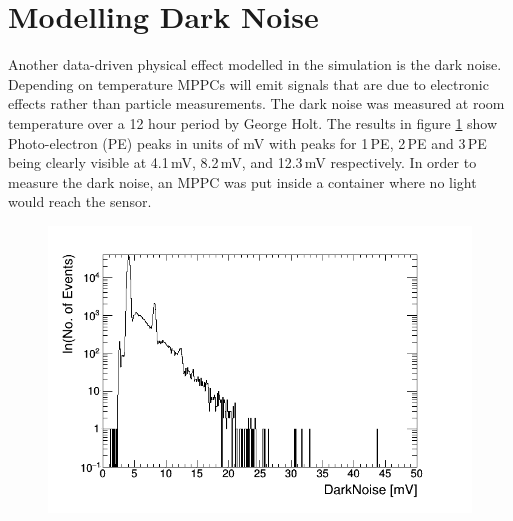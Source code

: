 \section{Modelling Dark Noise}\label{sec:GEANT4Simulation_ModellingDarkNoise}
Another data-driven physical effect modelled in the simulation is the dark noise. Depending on temperature MPPCs will emit signals that are due to electronic effects rather than particle measurements. The dark noise was measured at room temperature over a 12 hour period by George Holt. The results in figure \ref{fig:pureDarkNoise} show Photo-electron (PE) peaks in units of mV with peaks for 1\,PE, 2\,PE and 3\,PE being clearly visible at 4.1\,mV, 8.2\,mV, and 12.3\,mV respectively. In order to measure the dark noise, an MPPC was put inside a container where no light would reach the sensor. 
\begin{figure}[!h]
 \centering
 \includegraphics[width=0.7\linewidth]{pureDarkNoise_output.png}
 \label{fig:pureDarkNoise}
\end{figure}

